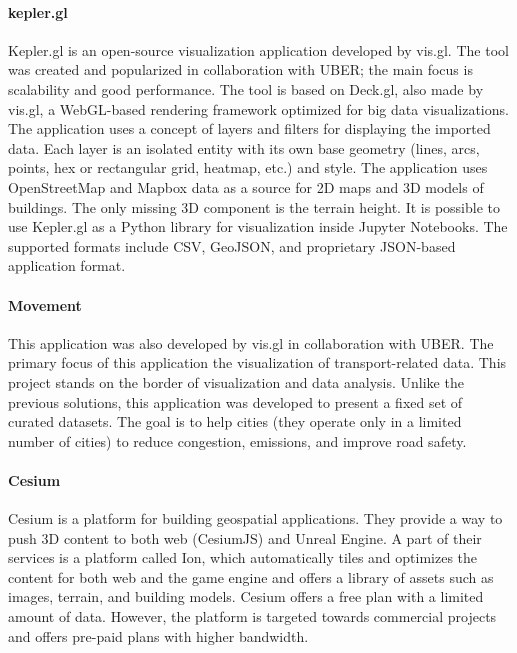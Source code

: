\paragraph{kepler.gl}
Kepler.gl is an open-source visualization application developed by vis.gl. The tool was created and popularized in collaboration with UBER; the main focus is scalability and good performance. The tool is based on Deck.gl, also made by vis.gl, a WebGL-based rendering framework optimized for big data visualizations. The application uses a concept of layers and filters for displaying the imported data. Each layer is an isolated entity with its own base geometry (lines, arcs, points, hex or rectangular grid, heatmap, etc.) and style. 
The application uses OpenStreetMap and Mapbox data as a source for 2D maps and 3D models of buildings. The only missing 3D component is the terrain height. It is possible to use Kepler.gl as a Python library for visualization inside Jupyter Notebooks. The supported formats include CSV, GeoJSON, and proprietary JSON-based application format. 

\paragraph{Movement}
This application was also developed by vis.gl in collaboration with UBER. The primary focus of this application the visualization of transport-related data. This project stands on the border of visualization and data analysis. Unlike the previous solutions, this application was developed to present a fixed set of curated datasets. The goal is to help cities (they operate only in a limited number of cities) to reduce congestion, emissions, and improve road safety.\\

\paragraph{Cesium}
Cesium is a platform for building geospatial applications. They provide a way to push 3D content to both web (CesiumJS) and Unreal Engine. A part of their services is a platform called Ion, which automatically tiles and optimizes the content for both web and the game engine and offers a library of assets such as images, terrain, and building models. Cesium offers a free plan with a limited amount of data. However, the platform is targeted towards commercial projects and offers pre-paid plans with higher bandwidth.\\


